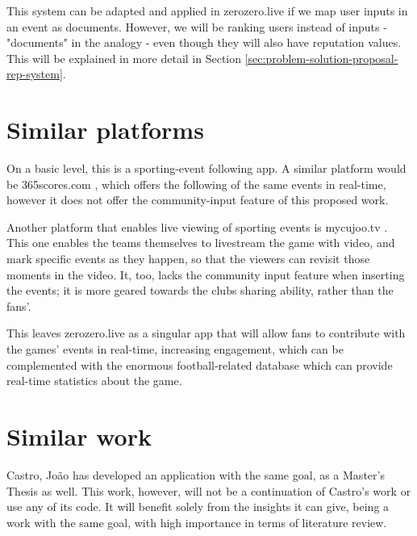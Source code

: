 \begin{enumerate}
    This system can be adapted and applied in zerozero.live if we map user inputs in an event as documents. However, we will be ranking users instead of inputs - "documents" in the analogy - even though they will also have reputation values. This will be explained in more detail in Section \ref{sec:problem-solution-proposal-rep-system}.
    
\end{enumerate} 

\section{Similar platforms}

On a basic level, this is a sporting-event following app. A similar platform would be 365scores.com \cite{365scores-about}, which offers the following of the same events in real-time, however it does not offer the community-input feature of this proposed work.

Another platform that enables live viewing of sporting events is mycujoo.tv \cite{mycujoo-about}. This one enables the teams themselves to livestream the game with video, and mark specific events as they happen, so that the viewers can revisit those moments in the video. It, too, lacks the community input feature when inserting the events; it is more geared towards the clubs sharing ability, rather than the fans'. 

This leaves zerozero.live as a singular app that will allow fans to contribute with the games' events in real-time, increasing engagement, which can be complemented with the enormous football-related database which can provide real-time statistics about the game.

\section{Similar work}

Castro, João \cite{PedroSousaCastro2020} has developed an application with the same goal, as a Master's Thesis as well. This work, however, will not be a continuation of Castro's work or use any of its code. It will benefit solely from the insights it can give, being a work with the same goal, with high importance in terms of literature review.

